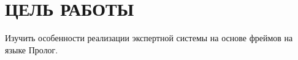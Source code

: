 \section{ЦЕЛЬ РАБОТЫ}

Изучить особенности реализации экспертной системы на основе фреймов на языке Пролог.